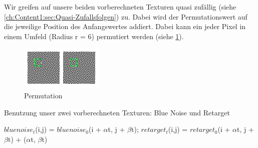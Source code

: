 Wir greifen auf unsere beiden vorberechneten Texturen quasi zufällig (siehe \ref{ch:Content1:sec:Quasi-Zufallsfolgen})
zu. Dabei wird der Permutationswert auf die jeweilige Position des Anfangswertes addiert.
Dabei kann ein jeder Pixel in einem Umfeld (Radius r = 6) permutiert werden (siehe \ref{pic:Permutation}).

\begin{figure}[H]
    \centering
    \includegraphics[width=0.5\linewidth]{content/simulatedAnnealing/Bilder/Permutation.png}
    \caption{Permutation}
    \label{pic:Permutation}
\end{figure}

\begin{algorithm}[H]
    \caption{Benutzung unser zwei vorberechneten Texturen: Blue Noise und Retarget}
    \begin{algorithmic}[1]
        \State $bluenoise_{t}$(i,j) = $bluenoise_{0}$(i + $\alpha$t, j + $\beta$t); 
        \State $retarget_{t}$(i,j) = $retarget_{0}$(i + $\alpha$t, j + $\beta$t) + ($\alpha$t, $\beta$t)
    \end{algorithmic}
    \label{alg:Benutzung vorberechneter Texturen}
\end{algorithm}

\newpage


